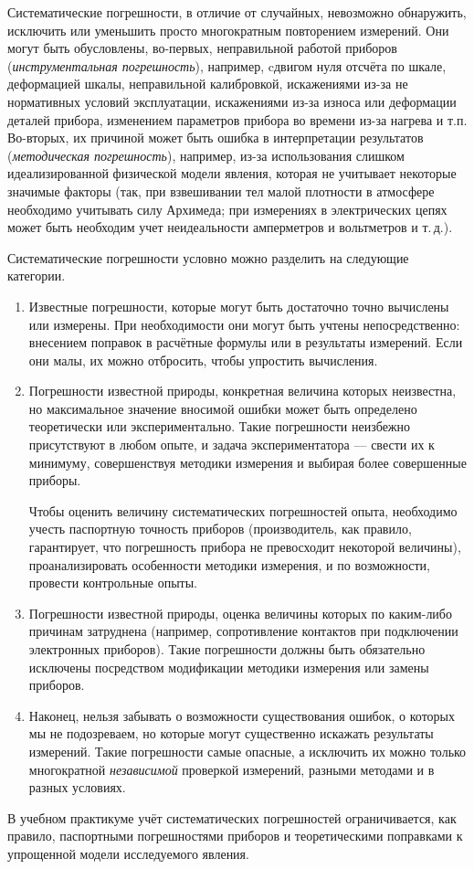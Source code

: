 Систематические погрешности, в отличие от случайных, невозможно обнаружить,
исключить или уменьшить просто многократным повторением измерений.
Они могут быть обусловлены, во-первых, неправильной работой приборов
(\emph{инструментальная погрешность}), например, cдвигом нуля отсчёта
по шкале, деформацией шкалы, неправильной калибровкой, искажениями
из-за не нормативных условий эксплуатации, искажениями из-за износа
или деформации деталей прибора, изменением параметров прибора во времени
из-за нагрева и т.п. Во-вторых, их причиной может быть ошибка в интерпретации
результатов (\emph{методическая погрешность}), например, из-за использования
слишком идеализированной физической модели явления, которая не учитывает
некоторые значимые факторы (так, при взвешивании тел малой плотности
в атмосфере необходимо учитывать силу Архимеда; при измерениях в электрических
цепях может быть необходим учет неидеальности амперметров и вольтметров
и т.\,д.).

Систематические погрешности условно можно разделить на следующие категории.

\begin{enumerate}
    \item Известные погрешности, которые могут быть достаточно точно вычислены
или измерены. При необходимости они могут быть учтены непосредственно:
внесением поправок в расчётные формулы или в результаты измерений.
Если они малы, их можно отбросить, чтобы упростить вычисления.

    \item Погрешности известной природы, конкретная величина которых неизвестна,
но максимальное значение вносимой ошибки может быть определено теоретически
или экспериментально. Такие погрешности неизбежно присутствуют в любом
опыте, и задача экспериментатора --- свести их к минимуму,
совершенствуя методики измерения и выбирая более совершенные приборы.

    Чтобы оценить величину систематических погрешностей опыта, необходимо
учесть паспортную точность приборов (производитель, как правило, гарантирует,
что погрешность прибора не превосходит некоторой величины), проанализировать
особенности методики измерения, и по возможности, провести контрольные
опыты.

    \item Погрешности известной природы, оценка величины которых по каким-либо
причинам затруднена (например, сопротивление контактов при подключении
электронных приборов). Такие погрешности должны быть обязательно исключены
посредством модификации методики измерения или замены приборов.

    \item Наконец, нельзя забывать о возможности существования ошибок, о
которых мы не подозреваем, но которые могут существенно искажать результаты
измерений. Такие погрешности самые опасные, а исключить их можно только
многократной \emph{независимой} проверкой измерений, разными методами
и в разных условиях.
\end{enumerate}

В учебном практикуме учёт систематических погрешностей ограничивается,
как правило, паспортными погрешностями приборов и теоретическими поправками
к упрощенной модели исследуемого явления.
